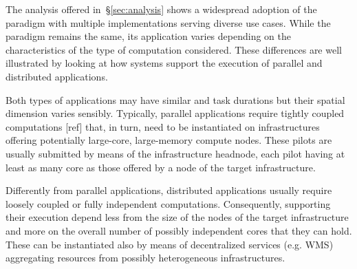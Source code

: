 \documentclass{sig-alternate}
\begin{document}
The analysis offered in~\S\ref{sec:analysis} shows a widespread adoption of the
\pilot paradigm with multiple implementations serving diverse use cases. While
the paradigm remains the same, its application varies depending on the
characteristics of the type of computation considered. These differences are
well illustrated by looking at how \pilot systems support the execution of
parallel and distributed applications.

Both types of applications may have similar \pilot and task durations but their
spatial dimension varies sensibly. Typically, parallel applications require
tightly coupled computations [ref] that, in turn, need \pilots to be
instantiated on infrastructures offering potentially large-core, large-memory
compute nodes. These pilots are usually submitted by means of the infrastructure
headnode, each pilot having at least as many core as those offered by a node of
the target infrastructure.

Differently from parallel applications, distributed applications usually require
loosely coupled or fully independent computations. Consequently, \pilots
supporting their execution depend less from the size of the nodes of the target
infrastructure and more on the overall number of possibly independent cores that
they can hold. These \pilots can be instantiated also by means of decentralized
services (e.g. WMS) aggregating resources from possibly heterogeneous
infrastructures.

\end{document}
